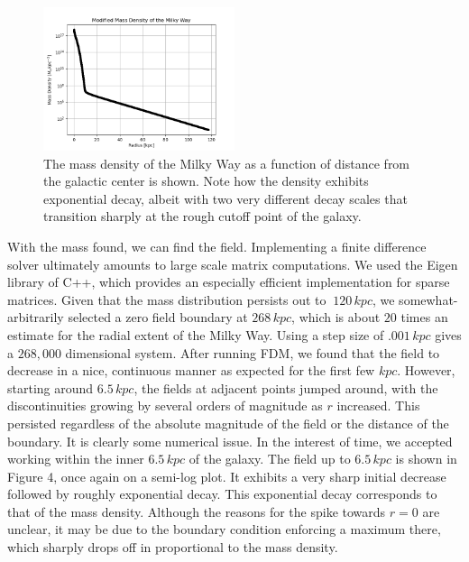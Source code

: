 \documentclass[11pt, twocolumn]{article}
\begin{document}
    \begin{figure}[h]
        \includegraphics[width=0.5\textwidth]{images/modmass.png}
        \caption{The mass density of the Milky Way as a function of distance from the galactic center is shown. Note how the density exhibits exponential decay, albeit with two very different decay scales that transition sharply at the rough cutoff point of the galaxy.}
        \label{fig:rotation}
    \end{figure}
    
    With the mass found, we can find the field. Implementing a finite difference solver ultimately amounts to large scale matrix computations. We used the Eigen library of C++, which provides an especially efficient implementation for sparse matrices. Given that the mass distribution persists out to $~120 \, \si{kpc}$, we somewhat-arbitrarily selected a zero field boundary at $268 \, \si{kpc}$, which is about $20$ times an estimate for the radial extent of the Milky Way. Using a step size of $.001 \, \si{kpc}$ gives a $268,000$ dimensional system. After running FDM, we found that the field to decrease in a nice, continuous manner as expected for the first few $\si{kpc}$. However, starting around $6.5 \, \si{kpc}$, the fields at adjacent points jumped around, with the discontinuities growing by several orders of magnitude as $r$ increased. This persisted regardless of the absolute magnitude of the field or the distance of the boundary. It is clearly some numerical issue. In the interest of time, we accepted working within the inner $6.5 \, \si{kpc}$ of the galaxy. The field up to $6.5 \, \si{kpc}$ is shown in Figure 4, once again on a semi-log plot. It exhibits a very sharp initial decrease followed by roughly exponential decay. This exponential decay corresponds to that of the mass density. Although the reasons for the spike towards $r = 0$ are unclear, it may be due to the boundary condition enforcing a maximum there, which sharply drops off in proportional to the mass density.
\end{document}
